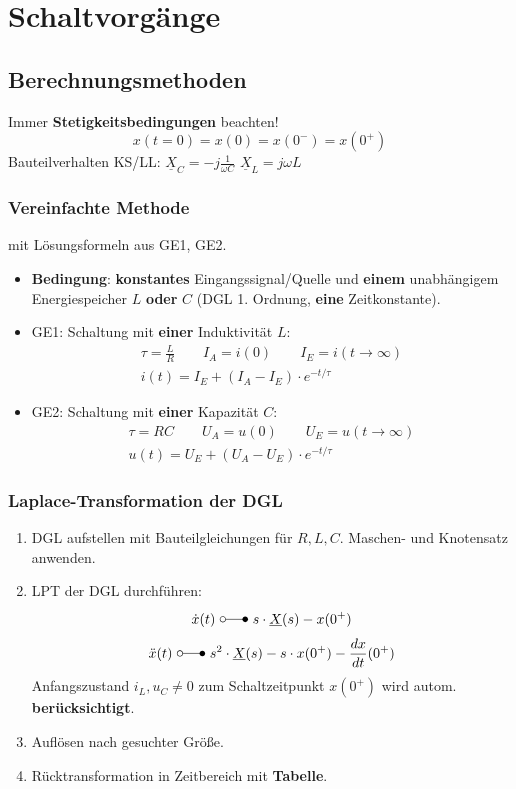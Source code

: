 \section{Schaltvorgänge}
\subsection{Berechnungsmethoden}
Immer \textbf{Stetigkeitsbedingungen} beachten!
\[
\boxed{x(t=0) = x(0) = x(0^-) = x(0^+)}
 \]
Bauteilverhalten KS/LL:
 $\underline{X}_C=-j\frac{1}{\omega C}$ \quad $\underline{X}_L =j \omega L$
\subsubsection{Vereinfachte Methode}
mit Lösungsformeln aus GE1, GE2.
\begin{itemize}
	\item \textbf{Bedingung}: \textbf{konstantes} Eingangssignal/Quelle und \textbf{einem} unabhängigem Energiespeicher $L$ \textbf{oder} $C$ (DGL 1. Ordnung, \textbf{eine} Zeitkonstante).
	\item GE1: Schaltung mit \textbf{einer} Induktivität $L$:
	\begin{gather*}
		\tau=\frac{L}{R} \qquad I_A = i(0) \qquad I_E=i(t\rightarrow\infty)\\
		\boxed{i(t)=I_E+(I_A-I_E)\cdot e^{-t/\tau}}
	\end{gather*}
	\item GE2: Schaltung mit \textbf{einer} Kapazität $C$:
	\begin{gather*}
		\tau=RC \qquad U_A = u(0) \qquad U_E=u(t\rightarrow\infty)\\
		\boxed{u(t)=U_E+(U_A-U_E)\cdot e^{-t/\tau}}
	\end{gather*}
	
\end{itemize}

\subsubsection{Laplace-Transformation der DGL}
\begin{enumerate}
	\item DGL aufstellen mit Bauteilgleichungen f\"ur $R,L,C$. Maschen- und Knotensatz anwenden.
	\item LPT der DGL durchführen:
	\[
	 \dot{x}(t) \ \laplace\ s\cdot\underline{X}(s)-x(0^+)
	\]
	\[
	\ddot{x}(t) \ \laplace\ s^2\cdot\underline{X}(s)-s\cdot x(0^+)-\frac{dx}{dt}(0^+)
	\]
	Anfangszustand $i_L, u_C \neq 0$ zum Schaltzeitpunkt $x(0^+)$ wird autom. \textbf{berücksichtigt}.
	\item Auflösen nach gesuchter Größe.
	\item Rücktransformation in Zeitbereich mit \textbf{Tabelle}.
\end{enumerate}

